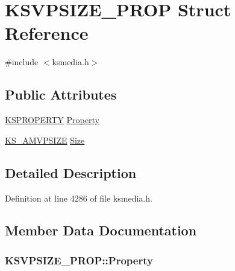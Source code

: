 \hypertarget{struct_k_s_v_p_s_i_z_e___p_r_o_p}{}\section{K\+S\+V\+P\+S\+I\+Z\+E\+\_\+\+P\+R\+OP Struct Reference}
\label{struct_k_s_v_p_s_i_z_e___p_r_o_p}


{\ttfamily \#include $<$ksmedia.\+h$>$}

\subsection*{Public Attributes}
\begin{DoxyCompactItemize}
\item 
\hyperlink{ks_8h_a4392f77c74e868d813d46c39ada4d660}{K\+S\+P\+R\+O\+P\+E\+R\+TY} \hyperlink{struct_k_s_v_p_s_i_z_e___p_r_o_p_a3d588fa60d03cf1401a39b526f1b8553}{Property}
\item 
\hyperlink{ksmedia_8h_ab315a2aac61b0ac0dac05dcfc7c74168}{K\+S\+\_\+\+A\+M\+V\+P\+S\+I\+ZE} \hyperlink{struct_k_s_v_p_s_i_z_e___p_r_o_p_ac64aded94f3ae644b8bbb6f0290fd95a}{Size}
\end{DoxyCompactItemize}


\subsection{Detailed Description}


Definition at line 4286 of file ksmedia.\+h.



\subsection{Member Data Documentation}
\subsubsection[{\texorpdfstring{Property}{Property}}]{ K\+S\+V\+P\+S\+I\+Z\+E\+\_\+\+P\+R\+O\+P\+::\+Property}\hypertarget{struct_k_s_v_p_s_i_z_e___p_r_o_p_a3d588fa60d03cf1401a39b526f1b8553}{}\label{struct_k_s_v_p_s_i_z_e___p_r_o_p_a3d588fa60d03cf1401a39b526f1b8553}


